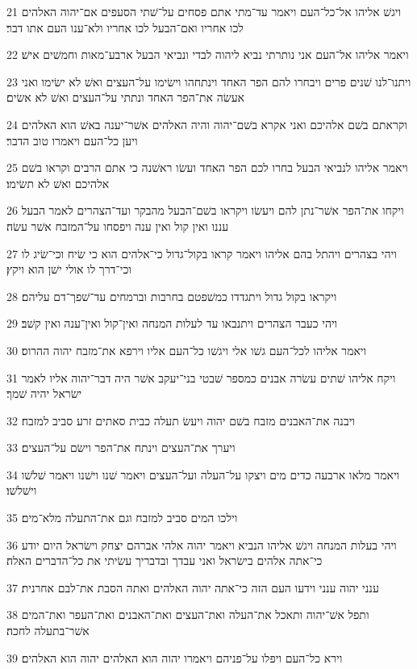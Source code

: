 \par 21 ויגשׁ אליהו אל־כל־העם ויאמר עד־מתי אתם פסחים על־שׁתי הסעפים אם־יהוה האלהים לכו אחריו ואם־הבעל לכו אחריו ולא־ענו העם אתו דבר׃
\par 22 ויאמר אליהו אל־העם אני נותרתי נביא ליהוה לבדי ונביאי הבעל ארבע־מאות וחמשׁים אישׁ׃
\par 23 ויתנו־לנו שׁנים פרים ויבחרו להם הפר האחד וינתחהו וישׂימו על־העצים ואשׁ לא ישׂימו ואני אעשׂה את־הפר האחד ונתתי על־העצים ואשׁ לא אשׂים׃
\par 24 וקראתם בשׁם אלהיכם ואני אקרא בשׁם־יהוה והיה האלהים אשׁר־יענה באשׁ הוא האלהים ויען כל־העם ויאמרו טוב הדבר׃
\par 25 ויאמר אליהו לנביאי הבעל בחרו לכם הפר האחד ועשׂו ראשׁנה כי אתם הרבים וקראו בשׁם אלהיכם ואשׁ לא תשׂימו׃
\par 26 ויקחו את־הפר אשׁר־נתן להם ויעשׂו ויקראו בשׁם־הבעל מהבקר ועד־הצהרים לאמר הבעל עננו ואין קול ואין ענה ויפסחו על־המזבח אשׁר עשׂה׃
\par 27 ויהי בצהרים ויהתל בהם אליהו ויאמר קראו בקול־גדול כי־אלהים הוא כי שׂיח וכי־שׂיג לו וכי־דרך לו אולי ישׁן הוא ויקץ׃
\par 28 ויקראו בקול גדול ויתגדדו כמשׁפטם בחרבות וברמחים עד־שׁפך־דם עליהם׃
\par 29 ויהי כעבר הצהרים ויתנבאו עד לעלות המנחה ואין־קול ואין־ענה ואין קשׁב׃
\par 30 ויאמר אליהו לכל־העם גשׁו אלי ויגשׁו כל־העם אליו וירפא את־מזבח יהוה ההרוס׃
\par 31 ויקח אליהו שׁתים עשׂרה אבנים כמספר שׁבטי בני־יעקב אשׁר היה דבר־יהוה אליו לאמר ישׂראל יהיה שׁמך׃
\par 32 ויבנה את־האבנים מזבח בשׁם יהוה ויעשׂ תעלה כבית סאתים זרע סביב למזבח׃
\par 33 ויערך את־העצים וינתח את־הפר וישׂם על־העצים׃
\par 34 ויאמר מלאו ארבעה כדים מים ויצקו על־העלה ועל־העצים ויאמר שׁנו וישׁנו ויאמר שׁלשׁו וישׁלשׁו׃
\par 35 וילכו המים סביב למזבח וגם את־התעלה מלא־מים׃
\par 36 ויהי בעלות המנחה ויגשׁ אליהו הנביא ויאמר יהוה אלהי אברהם יצחק וישׂראל היום יודע כי־אתה אלהים בישׂראל ואני עבדך ובדבריך עשׂיתי את כל־הדברים האלה׃
\par 37 ענני יהוה ענני וידעו העם הזה כי־אתה יהוה האלהים ואתה הסבת את־לבם אחרנית׃
\par 38 ותפל אשׁ־יהוה ותאכל את־העלה ואת־העצים ואת־האבנים ואת־העפר ואת־המים אשׁר־בתעלה לחכה׃
\par 39 וירא כל־העם ויפלו על־פניהם ויאמרו יהוה הוא האלהים יהוה הוא האלהים׃
